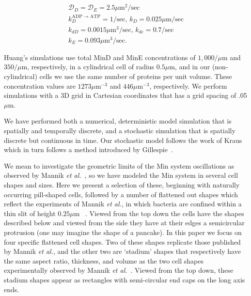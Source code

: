 \documentclass[10pt,letterpaper]{article}
\newcommand\micron{\ensuremath{\mu\text{m}}}
\begin{document}
\begin{gather*}
  \mathcal{D}_D = \mathcal{D}_{E} = 2.5\micron^2/\text{sec}\\
  k_D^{\textrm{ADP $\rightarrow$ ATP}} = 1/\textrm{sec,  }
  k_D = 0.025 \micron /\textrm{sec}\\
  k_{dD} = 0.0015 \micron^3/ \textrm{sec,  }
  k_{de} = 0.7/\textrm{sec}\\
  k_E = 0.093 \micron^3 /\textrm{sec}.
\end{gather*}

Huang's simulations use total MinD and MinE concentrations of
$1,000/\micron$ and $350/\micron$, respectively, in a cylindrical cell
of radius $0.5\micron$, and in our (non-cylindrical) cells we use the
same number of proteins per unit volume.  These concentration values
are $1273\micron^{-3}$ and $446\micron^{-3}$, respectively. We perform
simulations with a 3D grid in Cartesian coordinates that has a grid
spacing of .05\micron.

We have performed both a numerical, deterministic model simulation
that is spatially and temporally discrete, and a stochastic simulation
that is spatially discrete but continuous in time.  Our stochastic
model follows the work of Kraus~\cite{kraus1996crosstalk} which in
turn follows a method introduced by
Gillespie~\cite{gillespie1977exact}.

We mean to investigate the geometric limits of the Min system
oscillations as observed by Mannik \emph{et
  al.}~\cite{mannik2012robustness}, so we have modeled the Min system
in several cell shapes and sizes.  Here we present a selection of
these, beginning with naturally occurring pill-shaped cells, followed
by a number of flattened out shapes which reflect the experiments of
Mannik \emph{et al.}, in which bacteria are confined within a thin
slit of height $0.25\micron$ ~\cite{mannik2012robustness}.  Viewed
from the top down the cells have the shapes described below and viewed
from the side they have at their edges a semicircular protrusion (one
may imagine the shape of a pancake).
%
In this paper we focus on four specific flattened cell shapes.  Two of
these shapes replicate those published by Mannik \emph{et al.}, and
the other two are `stadium' shapes that respectively have the same
aspect ratio, thickness, and volume as the two cell shapes
experimentally observed by Mannik \emph{et
  al.}~\cite{mannik2012robustness}.  Viewed from the top down, these
stadium shapes appear as rectangles with semi-circular end caps on the
long axis ends.
\end{document}
